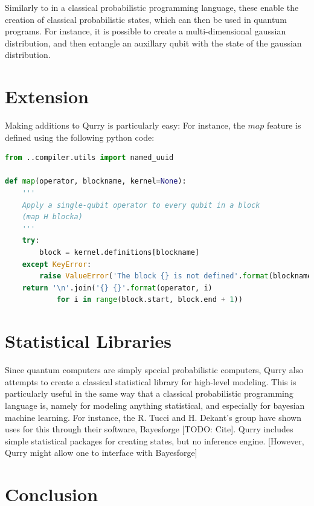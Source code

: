\documentclass[a4paper,twocolumn,11pt,accepted=2017-05-09]{quantumarticle}
\begin{document}
    Similarly to in a classical probabilistic programming language, these enable the creation of classical probabilistic states, which can then be used in quantum programs.
    For instance, it is possible to create a multi-dimensional gaussian distribution, and then entangle an auxillary qubit with the state of the gaussian distribution.

    \section{Extension}

    Making additions to Qurry is particularly easy:
    For instance, the $map$ feature is defined using the following python code:

    \begin{lstlisting}[language=Python]
from ..compiler.utils import named_uuid

def map(operator, blockname, kernel=None):
    '''
    Apply a single-qubit operator to every qubit in a block
    (map H blocka)
    '''
    try:
        block = kernel.definitions[blockname]
    except KeyError:
        raise ValueError('The block {} is not defined'.format(blockname))
    return '\n'.join('{} {}'.format(operator, i)
            for i in range(block.start, block.end + 1))
    \end{lstlisting}

\section{Statistical Libraries}

Since quantum computers are simply special probabilistic computers, Qurry also attempts to create a classical statistical library for high-level modeling. 
This is particularly useful in the same way that a classical probabilistic programming language is, namely for modeling anything statistical, and especially for bayesian machine learning.
For instance, the R. Tucci and H. Dekant's group have shown uses for this through their software, Bayesforge [TODO: Cite].
Qurry includes simple statistical packages for creating states, but no inference engine.
[However, Qurry might allow one to interface with Bayesforge]

\section{Conclusion}
\end{document}
